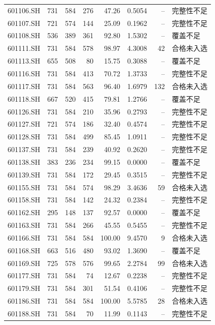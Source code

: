 \documentclass[10pt,a4paper]{article}
\begin{document}
\begin{longtable}{lrrr r r r l}
601106.SH & 731 & 584 & 276 & 47.26 & 0.5054 & -- & 完整性不足\\
601107.SH & 721 & 574 & 144 & 25.09 & 0.1962 & -- & 完整性不足\\
601108.SH & 536 & 389 & 361 & 92.80 & 1.5302 & -- & 覆盖不足\\
601111.SH & 731 & 584 & 578 & 98.97 & 4.3008 & 42 & 合格未入选\\
601113.SH & 655 & 508 & 80 & 15.75 & 0.3088 & -- & 覆盖不足\\
601116.SH & 731 & 584 & 413 & 70.72 & 1.3733 & -- & 完整性不足\\
601117.SH & 731 & 584 & 563 & 96.40 & 1.6979 & 132 & 合格未入选\\
601118.SH & 667 & 520 & 415 & 79.81 & 1.2766 & -- & 覆盖不足\\
601126.SH & 731 & 584 & 210 & 35.96 & 0.2793 & -- & 完整性不足\\
601127.SH & 721 & 574 & 186 & 32.40 & 0.4574 & -- & 完整性不足\\
601128.SH & 731 & 584 & 499 & 85.45 & 1.0911 & -- & 完整性不足\\
601137.SH & 731 & 584 & 239 & 40.92 & 0.2620 & -- & 完整性不足\\
601138.SH & 383 & 236 & 234 & 99.15 & 0.0000 & -- & 覆盖不足\\
601139.SH & 731 & 584 & 172 & 29.45 & 0.3515 & -- & 完整性不足\\
601155.SH & 731 & 584 & 574 & 98.29 & 3.4636 & 59 & 合格未入选\\
601158.SH & 731 & 584 & 142 & 24.32 & 0.2384 & -- & 完整性不足\\
601162.SH & 295 & 148 & 137 & 92.57 & 0.0000 & -- & 覆盖不足\\
601163.SH & 731 & 584 & 266 & 45.55 & 0.5455 & -- & 完整性不足\\
601166.SH & 731 & 584 & 584 & 100.00 & 9.4570 & 9 & 合格未入选\\
601168.SH & 663 & 516 & 480 & 93.02 & 1.3690 & -- & 覆盖不足\\
601169.SH & 725 & 578 & 576 & 99.65 & 2.2784 & 99 & 合格未入选\\
601177.SH & 731 & 584 & 74 & 12.67 & 0.2238 & -- & 完整性不足\\
601179.SH & 731 & 584 & 301 & 51.54 & 0.4106 & -- & 完整性不足\\
601186.SH & 731 & 584 & 584 & 100.00 & 5.5785 & 28 & 合格未入选\\
601188.SH & 731 & 584 & 70 & 11.99 & 0.1143 & -- & 完整性不足\\

\end{longtable}
\end{document}
